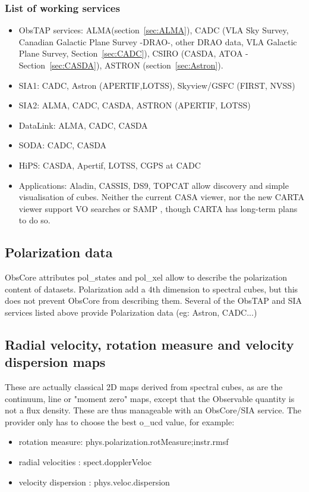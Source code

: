 \documentclass[11pt,a4paper]{ivoatex/ivoa}
\begin{document}
\subsubsection{List of working services}
\begin{itemize}
\item ObsTAP services: ALMA(section~\ref{sec:ALMA}), CADC (VLA Sky Survey, Canadian Galactic Plane 
Survey -DRAO-, other DRAO data, VLA Galactic Plane Survey, Section~\ref{sec:CADC}), CSIRO (CASDA, ATOA - 
Section~\ref{sec:CASDA}), ASTRON (section~\ref{sec:Astron}).
\item SIA1: CADC, Astron (APERTIF,LOTSS), Skyview/GSFC (FIRST, NVSS)
\item SIA2: ALMA, CADC, CASDA, ASTRON (APERTIF, LOTSS)
\item DataLink: ALMA, CADC, CASDA
\item SODA: CADC, CASDA
\item HiPS: CASDA, Apertif, LOTSS, CGPS at CADC
\item Applications: Aladin, CASSIS,  DS9, TOPCAT allow discovery and simple visualisation of cubes. Neither the 
current CASA viewer, nor the new CARTA viewer support VO searches or SAMP \citep{2009ivoa.spec.0421B}, 
though CARTA has long-term plans to do so.
\end{itemize}


\subsection{Polarization data}
ObsCore attributes pol\_states and pol\_xel allow to describe the polarization content of datasets. 
Polarization add a 4th dimension to spectral cubes, but this does not prevent ObsCore from describing 
them. Several of the ObsTAP and SIA services listed above provide Polarization data (eg: Astron, 
CADC...)


\subsection{Radial velocity, rotation measure and velocity dispersion maps}
These are actually classical 2D maps derived from spectral cubes, as are the continuum, line or "moment 
zero" maps, except that the Observable quantity is not a flux density. These are thus manageable with 
an ObsCore/SIA service. The provider only has to choose the best o\_ucd value, for example:

\begin{itemize}
    \item rotation measure: phys.polarization.rotMeasure;instr.rmsf
    \item radial velocities : spect.dopplerVeloc
    \item velocity dispersion : phys.veloc.dispersion
\end{itemize}
\end{document}
